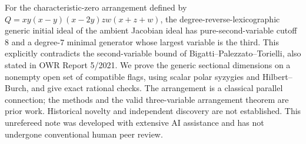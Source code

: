 
For the characteristic-zero arrangement defined by
$Q=xy(x-y)(x-2y)zw(x+z+w)$, the degree-reverse-lexicographic
generic initial ideal of the ambient Jacobian ideal has pure-second-variable
cutoff $8$ and a degree-$7$ minimal generator whose largest variable is the
third. This explicitly contradicts the second-variable bound of
Bigatti--Palezzato--Torielli, also stated in OWR Report 5/2021.
We prove the generic sectional dimensions on a nonempty open set of compatible
flags, using scalar polar syzygies and Hilbert--Burch, and give exact rational
checks. The arrangement is a classical parallel connection; the methods and
the valid three-variable arrangement theorem are prior work. Historical
novelty and independent discovery are not established. This unrefereed note
was developed with extensive AI assistance and has not undergone conventional
human peer review.
